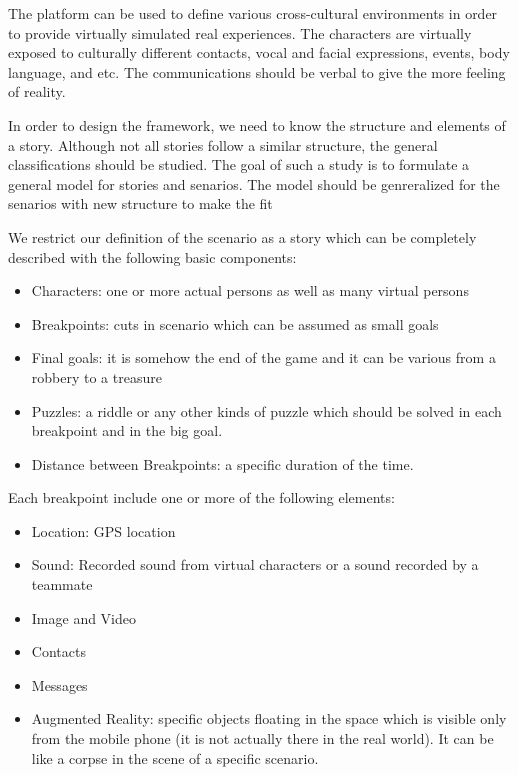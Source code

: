 \documentclass[conference]{IEEEtran}
\begin{document}
The platform can be used to define various cross-cultural environments in order to
provide virtually simulated real experiences. The characters are virtually exposed to culturally
different contacts, vocal and facial expressions, events, body language, and etc.
The communications should be verbal to give the more feeling of reality.


In order to design the framework, we need to know the structure and 
elements of a story. Although not all stories follow a similar structure,
the general classifications should be studied. The goal of such a study is to 
formulate a general model for stories and senarios. The model should be genreralized
for the senarios with new structure to make the fit  

We restrict our definition of the scenario as a story which
can be completely described with the following basic components:
\begin{itemize}
\item Characters: one or more actual persons as well as many virtual persons
\item Breakpoints: cuts in scenario which can be assumed as small goals 
\item Final goals: it is somehow the end of the game and 
it can be various from a robbery to a treasure
\item Puzzles: a riddle or any other kinds of puzzle which should be solved in each 
      breakpoint and in the big goal.
\item Distance between Breakpoints: a specific duration of the time.
\end{itemize}

Each breakpoint include one or more of the following elements:
\begin{itemize}
\item Location: GPS location
\item Sound: Recorded sound from virtual characters or a sound
recorded by a teammate
\item Image and Video
\item Contacts
\item Messages
\item Augmented Reality: specific objects floating in the space which is 
visible only from the mobile phone (it is not actually there in the real world).
It can be like a corpse in the scene of a specific scenario.
\end{itemize}
\end{document}
